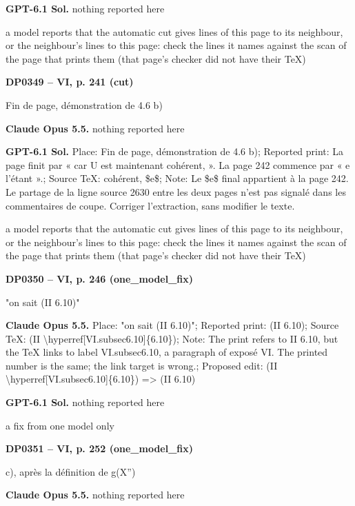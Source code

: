 \textbf{GPT-6.1 Sol.} nothing reported here\par
a model reports that the automatic cut gives lines of this page to its neighbour, or the neighbour's lines to this page: check the lines it names against the scan of the page that prints them (that page's checker did not have their TeX)\par
\par\noindent\hypertarget{DP0349}{}\textbf{DP0349 -- VI, p. 241 (cut)}\par
Fin de page, démonstration de 4.6 b)\par
\textbf{Claude Opus 5.5.} nothing reported here\par
\textbf{GPT-6.1 Sol.} Place: Fin de page, démonstration de 4.6 b); Reported print: La page finit par « car U est maintenant cohérent, ». La page 242 commence par « e l'étant ».; Source TeX: cohérent, \$e\$; Note: Le \$e\$ final appartient à la page 242. Le partage de la ligne source 2630 entre les deux pages n'est pas signalé dans les commentaires de coupe. Corriger l'extraction, sans modifier le texte.\par
a model reports that the automatic cut gives lines of this page to its neighbour, or the neighbour's lines to this page: check the lines it names against the scan of the page that prints them (that page's checker did not have their TeX)\par
\par\noindent\hypertarget{DP0350}{}\textbf{DP0350 -- VI, p. 246 (one\_model\_fix)}\par
"on sait (II 6.10)"\par
\textbf{Claude Opus 5.5.} Place: "on sait (II 6.10)"; Reported print: (II 6.10); Source TeX: (II \textbackslash{}hyperref[VI.subsec6.10]\{6.10\}); Note: The print refers to II 6.10, but the TeX links to label VI.subsec6.10, a paragraph of exposé VI. The printed number is the same; the link target is wrong.; Proposed edit: (II \textbackslash{}hyperref[VI.subsec6.10]\{6.10\}) =\allowbreak > (II 6.10)\par
\textbf{GPT-6.1 Sol.} nothing reported here\par
a fix from one model only\par
\par\noindent\hypertarget{DP0351}{}\textbf{DP0351 -- VI, p. 252 (one\_model\_fix)}\par
c), après la définition de g(X'')\par
\textbf{Claude Opus 5.5.} nothing reported here\par
